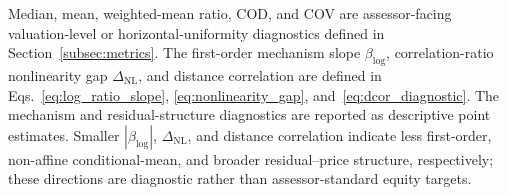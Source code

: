 \documentclass[10pt]{article}
\theoremstyle{definition}
\newcommand{\1}{\mathbf{1}}
\begin{document}
{\begin{table}[!htbp]
\begin{minipage}{\textwidth}
Median, mean, weighted-mean ratio, COD, and COV are assessor-facing valuation-level or horizontal-uniformity diagnostics defined in Section~\ref{subsec:metrics}. The first-order mechanism slope $\beta_{\log}$, correlation-ratio nonlinearity gap $\Delta_{\mathrm{NL}}$, and distance correlation are defined in Eqs.~\eqref{eq:log_ratio_slope}, \eqref{eq:nonlinearity_gap}, and~\eqref{eq:dcor_diagnostic}. The mechanism and residual-structure diagnostics are reported as descriptive point estimates. Smaller $|\beta_{\log}|$, $\Delta_{\mathrm{NL}}$, and distance correlation indicate less first-order, non-affine conditional-mean, and broader residual--price structure, respectively; these directions are diagnostic rather than assessor-standard equity targets.
\end{minipage}
\end{table}
}
\end{document}
